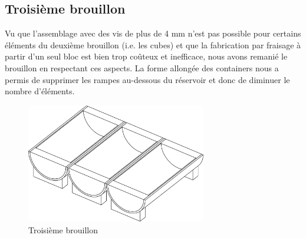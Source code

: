 \subsection{Troisième brouillon}
Vu que l'assemblage avec des vis de plus de 4 mm n'est pas possible pour certains éléments du deuxième brouillon (i.e. les cubes) et que la fabrication par fraisage à partir d'un seul bloc est bien trop coûteux et inefficace, nous avons remanié le brouillon en respectant ces aspects. La forme allongée des containers nous a permis de supprimer les rampes au-dessous du réservoir et donc de diminuer le nombre d'éléments.

\begin{figure}[h]
    \centering
    \includegraphics[width=0.7\textwidth]{Graphics/Reservoir_final/TROISIEME_BROUILLON.pdf}
    \caption{Troisième brouillon}
\end{figure}



